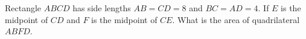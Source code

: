 Rectangle $ABCD$ has side lengths $AB = CD = 8$ and $BC = AD = 4$. If $E$ is the midpoint of $CD$ and $F$ is the midpoint of $CE$. What is the area of quadrilateral $ABFD$.
